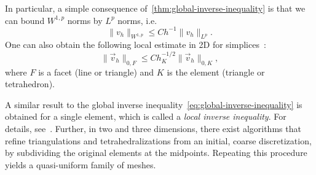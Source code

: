 In particular, a simple consequence of~\eqref{thm:global-inverse-inequality} is that we can bound $W^{1,p}$ norms by $L^p$ norms, i.e.
\begin{equation*}
    \| v_h \|_{W^{1,p}} \leq C h^{-1} \| v_h \|_{L^p}.
\end{equation*}
One can also obtain the following local estimate in 2D for simplices~\cite{warburton2003constants}:
\begin{equation}
    \| \vec v_h \|_{0,F} \leq C h_K^{-1/2} \| \vec v_h \|_{0,K},
\end{equation}
where $F$ is a facet (line or triangle) and $K$ is the element (triangle or tetrahedron). 

A similar result to the global inverse inequality~\eqref{eq:global-inverse-inequality} is obtained for a single element, which is called a \emph{local inverse inequality}. For details, see~\cite[Lemma 1.138]{ern2004theory}. Further, in two and three dimensions, there exist algorithms that refine triangulations and tetrahedralizations from an initial, coarse discretization, by subdividing the original elements at the midpoints. Repeating this procedure yields a quasi-uniform family of meshes. 
